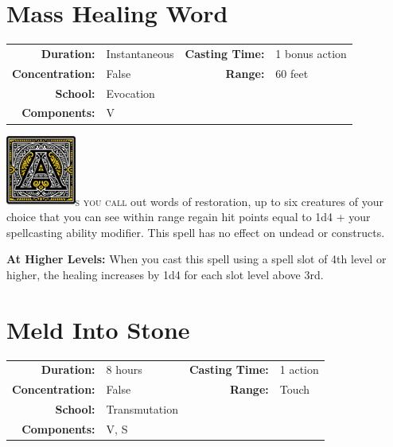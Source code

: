 \documentclass[12pt,showtrims]{memoir}
\begin{document}
\section*{Mass Healing Word}

{
\small\centering\vspace{-6pt}
\begin{tabular}{rlrl}
\toprule

\textbf{Duration:} & Instantaneous &
\textbf{Casting Time:} & 1 bonus action \\
\textbf{Concentration:} & False &
\textbf{Range:} & 60 feet \\
\textbf{School:} & Evocation \\
\textbf{Components:} & \multicolumn{3}{p{0.7\textwidth}}{V}\\

\bottomrule
\end{tabular}
}

\vspace{1\baselineskip}\noindent
\lettrine[lines=4]{\includegraphics[height=66pt]{initials/A.png}}{s you call} out words of restoration, up to six creatures of your choice that you can see within range regain hit points equal to 1d4 + your spellcasting ability modifier. This spell has no effect on undead or constructs.

\vspace{8pt} \noindent\textbf{At Higher Levels:} When you cast this spell using a spell slot of 4th level or higher, the healing increases by 1d4 for each slot level above 3rd.
\newpage
\section*{Meld Into Stone}

{
\small\centering\vspace{-6pt}
\begin{tabular}{rlrl}
\toprule

\textbf{Duration:} & 8 hours &
\textbf{Casting Time:} & 1 action \\
\textbf{Concentration:} & False &
\textbf{Range:} & Touch \\
\textbf{School:} & Transmutation \\
\textbf{Components:} & \multicolumn{3}{p{0.7\textwidth}}{V, S}\\

\bottomrule
\end{tabular}
}
\end{document}
